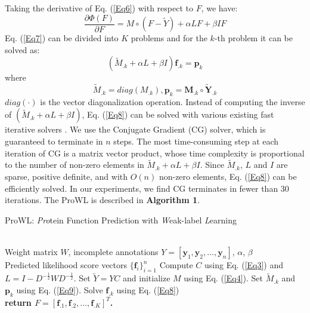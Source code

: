 \documentclass{llncs} %
\begin{document}
Taking the derivative of Eq. (\ref{Eq6}) with respect to $F$, we have:
\begin{equation}
\frac{\partial \Phi(F)}{\partial F}=M \circ (F-\tilde{Y})+ \alpha LF+ \beta IF
\label{Eq7}
\end{equation}
Eq. (\ref{Eq7}) can be divided into $K$ problems and for the $k$-th problem it can be solved as:
\begin{equation}
(\tilde{M}_{.k}+\alpha L +\beta I) \mathbf{f}_{.k} = \mathbf{p}_k
\label{Eq8}
\end{equation}
where
\begin{equation}
\tilde{M}_{.k}=diag(M_{.k}), \mathbf{p}_k=\mathbf{M}_{.k} \circ \tilde{\mathbf{Y}}_{.k}
 \label{Eq9}
\end{equation}
 $diag(\cdot)$ is the vector diagonalization operation. Instead of computing the inverse of $(\tilde{M}_{.k}+\alpha L+ \beta I)$, Eq. (\ref{Eq8}) can be solved with various existing fast iterative solvers \cite{nocedal1999numerical}. We use the Conjugate Gradient (CG) solver, which is guaranteed to terminate in $n$ steps. The most time-consuming step at each iteration of CG is a matrix vector product, whose time complexity is proportional to the number of non-zero elements in $\tilde{M}_{.k}+\alpha L+ \beta I$. Since $\tilde{M}_{.k}$, $L$ and $I$ are sparse, positive definite, and with $O(n)$ non-zero elements, Eq. (\ref{Eq8}) can be efficiently solved. In our experiments, we find CG terminates in fewer than 30 iterations. The ProWL is described in {\bf Algorithm 1}.
 \begin{algorithm}[h]
\caption{ProWL: \textit{Pro}tein Function Prediction with \textit{W}eak-label \textit{L}earning}
\begin{algorithmic}[1]
\REQUIRE ~~\\
\quad Weight matrix $W$, incomplete annotations $Y=[\mathbf{y}_1,\mathbf{y}_2,\ldots,\mathbf{y}_n]$, $\alpha$, $\beta$
\ENSURE ~~\\
\quad Predicted likelihood score vectors $\{\mathbf{f}_i\}_{i=1}^{n}$
\quad \STATE Compute $C$ using Eq. (\ref{Eq3}) and $L=I-D^{-\frac{1}{2}}WD^{-\frac{1}{2}}$.
\quad \STATE Set $\tilde{Y}=YC$ and initialize $M$ using Eq. (\ref{Eq4}).
    \STATE Set $\tilde{M}_{.k}$ and $\mathbf{p}_k$ using Eq. (\ref{Eq9}).
    \STATE Solve $\mathbf{f}_{.k}$ using Eq. (\ref{Eq8})
\ENDFOR\\
\STATE \bf return $F=[\mathbf{f}_{.1},\mathbf{f}_{.2},\ldots,\mathbf{f}_{.K}]^T$.
\end{algorithmic}
\label{algorithm1}
\end{algorithm}
\end{document}
